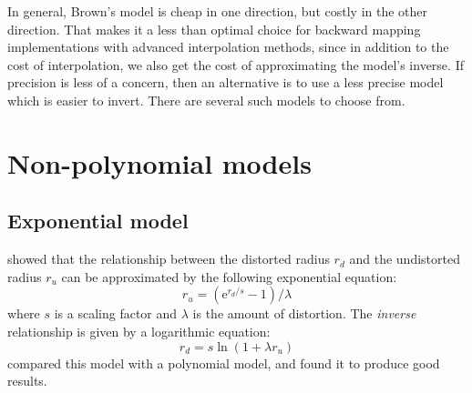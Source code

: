 \documentclass[english,12pt]{ifimaster}
\begin{document}
In general, Brown's model is cheap in one direction, but costly in the
other direction. That makes it a less than optimal choice for backward
mapping implementations with advanced interpolation methods, since in
addition to the cost of interpolation, we also get the cost of
approximating the model's inverse. If precision is less of a concern,
then an alternative is to use a less precise model which is easier to
invert. There are several such models to choose from.




\section{Non-polynomial models}

\subsection{Exponential model}
\label{sec:exponential}


\citet{schwarz80:-comput} showed that the relationship between the
distorted radius $r_d$ and the undistorted radius $r_u$ can be
approximated by the following exponential equation:
\begin{equation}
  \label{eq:exp}
  r_u = (\mathrm{e}^{r_d/s} - 1) / \lambda
\end{equation}
where $s$ is a scaling factor and $\lambda$ is the amount of
distortion. The \emph{inverse} relationship is given by a logarithmic
equation:
\begin{equation}
  \label{eq:logarithm}
  r_d = s\ln(1 + \lambda r_u)
\end{equation}
\citet{basu95:-alter} compared this model with a polynomial model, and
found it to produce good results.
\end{document}
